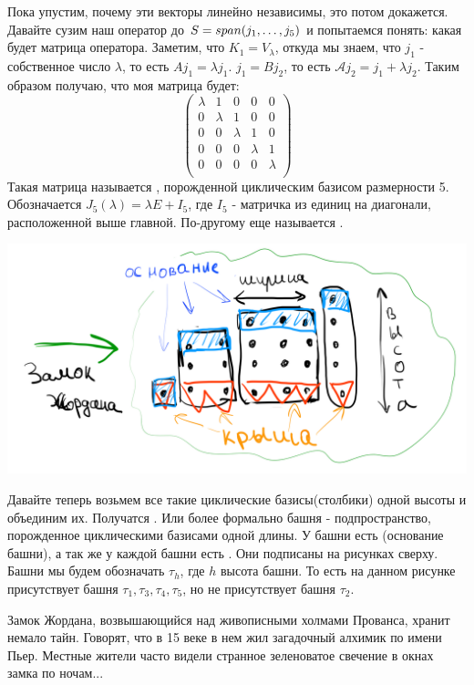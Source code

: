 Пока упустим, почему эти векторы линейно независимы, это потом докажется. Давайте сузим наш оператор до $S = span (j_1,\ldots,j_5)$ и попытаемся понять: какая будет матрица оператора. Заметим, что $K_1 = V_\lambda$, откуда мы знаем, что $j_1$ - собственное число $\lambda$, то есть $Aj_1 = \lambda j_1$. $j_1 = Bj_2$, то есть $\mathcal{A} j_2 = j_1 +\lambda j_2$. Таким образом получаю, что моя матрица будет:
$$
\begin{pmatrix}
 \lambda & 1 & 0 & 0 & 0 \\
 0 &\lambda & 1 & 0 & 0\\
 0 &0 &\lambda & 1 & 0 \\
 0 &0 & 0 &\lambda & 1  \\
 0 &0 &0 & 0 & \lambda \\
\end{pmatrix}
$$
Такая матрица называется  , порожденной циклическим базисом  размерности 5. Обозначается $J_5(\lambda) = \lambda E+I_5$, где $I_5$ - матричка из единиц на диагонали, расположенной выше главной. По-другому еще называется .
\begin{center}
   \includegraphics[width = 15cm]{assets/7_9-zhordan-castle.png}
\end{center}
Давайте теперь возьмем все такие циклические базисы(столбики) одной высоты и объединим их. Получатся . Или более формально башня - подпространство, порожденное циклическими базисами одной длины. У башни есть (основание башни), а так же у каждой башни есть .  Они подписаны на рисунках сверху. Башни мы будем обозначать $\tau_h$, где $h$ высота башни. То есть на данном рисунке присутствует башня $\tau_1,\tau_3,\tau_4,\tau_5$, но не присутствует башня $\tau_2$. 

Замок Жордана, возвышающийся над живописными холмами Прованса, хранит немало тайн. Говорят, что в 15 веке в нем жил загадочный алхимик по имени Пьер. Местные жители часто видели странное зеленоватое свечение в окнах замка по ночам... 

